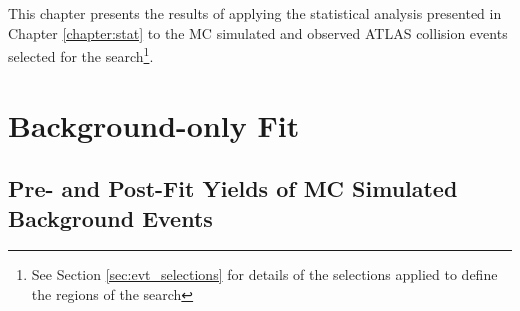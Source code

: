 \label{chapter:results}

This chapter presents the results of applying the statistical analysis presented in Chapter \ref{chapter:stat} to the MC simulated and observed ATLAS collision events selected for the search\footnote{See Section \ref{sec:evt_selections} for details of the selections applied to define the regions of the search}.  


\section{Background-only Fit}

\subsection{Pre- and Post-Fit Yields of MC Simulated Background Events}


